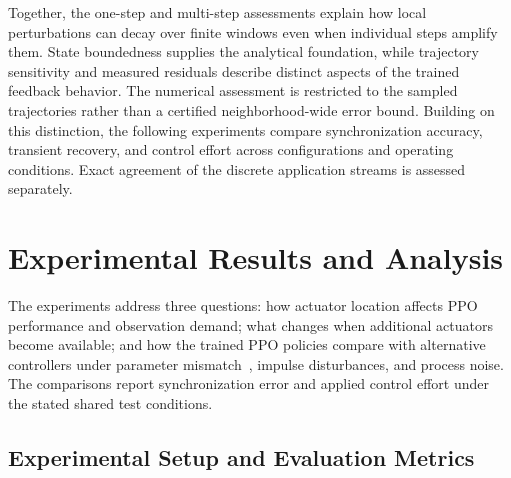 \documentclass[a4paper,fleqn]{cas-dc}
\theoremstyle{plain}
\theoremstyle{definition}
\begin{document}
Together, the one-step and multi-step assessments explain how local perturbations can decay over finite windows even when individual steps amplify them. State boundedness supplies the analytical foundation, while trajectory sensitivity and measured residuals describe distinct aspects of the trained feedback behavior. The numerical assessment is restricted to the sampled trajectories rather than a certified neighborhood-wide error bound. Building on this distinction, the following experiments compare synchronization accuracy, transient recovery, and control effort across configurations and operating conditions. Exact agreement of the discrete application streams is assessed separately.

\section{Experimental Results and Analysis}
\label{sec:experiments}

The experiments address three questions: how actuator location affects PPO performance and observation demand; what changes when additional actuators become available; and how the trained PPO policies compare with alternative controllers under parameter mismatch~\cite{kobiolka2025reducedorder}, impulse disturbances, and process noise. The comparisons report synchronization error and applied control effort under the stated shared test conditions.

\subsection{Experimental Setup and Evaluation Metrics}
\label{subsec:experimental_setup}
\end{document}
